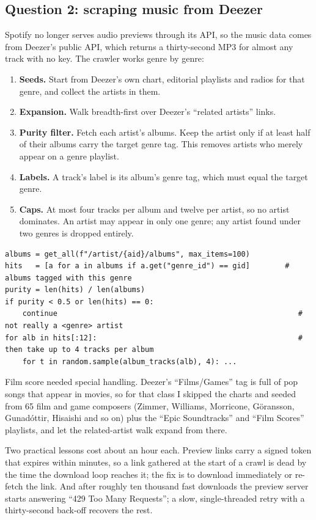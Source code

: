 \documentclass[11pt]{article}
\begin{document}
\subsection{Question 2: scraping music from Deezer}
Spotify no longer serves audio previews through its API, so the music data comes from Deezer's public API, which returns a thirty-second MP3 for almost any track with no key. The crawler works genre by genre:
\begin{enumerate}
  \item \textbf{Seeds.} Start from Deezer's own chart, editorial playlists and radios for that genre, and collect the artists in them.
  \item \textbf{Expansion.} Walk breadth-first over Deezer's ``related artists'' links.
  \item \textbf{Purity filter.} Fetch each artist's albums. Keep the artist only if at least half of their albums carry the target genre tag. This removes artists who merely appear on a genre playlist.
  \item \textbf{Labels.} A track's label is its album's genre tag, which must equal the target genre.
  \item \textbf{Caps.} At most four tracks per album and twelve per artist, so no artist dominates. An artist may appear in only one genre; any artist found under two genres is dropped entirely.
\end{enumerate}
\begin{lstlisting}
albums = get_all(f"/artist/{aid}/albums", max_items=100)
hits   = [a for a in albums if a.get("genre_id") == gid]        # albums tagged with this genre
purity = len(hits) / len(albums)
if purity < 0.5 or len(hits) == 0:
    continue                                                       # not really a <genre> artist
for alb in hits[:12]:                                              # then take up to 4 tracks per album
    for t in random.sample(album_tracks(alb), 4): ...
\end{lstlisting}
Film score needed special handling. Deezer's ``Films/Games'' tag is full of pop songs that appear in movies, so for that class I skipped the charts and seeded from 65 film and game composers (Zimmer, Williams, Morricone, G\"oransson, Gu\dh nad\'ottir, Hisaishi and so on) plus the ``Epic Soundtracks'' and ``Film Scores'' playlists, and let the related-artist walk expand from there.

Two practical lessons cost about an hour each. Preview links carry a signed token that expires within minutes, so a link gathered at the start of a crawl is dead by the time the download loop reaches it; the fix is to download immediately or re-fetch the link. And after roughly ten thousand fast downloads the preview server starts answering ``429 Too Many Requests''; a slow, single-threaded retry with a thirty-second back-off recovers the rest.
\end{document}
